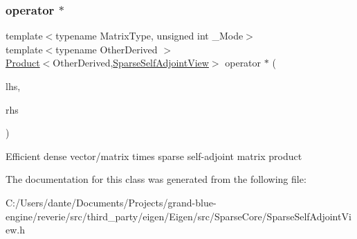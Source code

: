\subsubsection{\texorpdfstring{operator $\ast$}{operator *}\hspace{0.1cm}{\footnotesize\ttfamily [2/2]}}
{\footnotesize\ttfamily template$<$typename Matrix\+Type, unsigned int \+\_\+\+Mode$>$ \\
template$<$typename Other\+Derived $>$ \\
\mbox{\hyperlink{class_eigen_1_1_product}{Product}}$<$Other\+Derived,\mbox{\hyperlink{class_eigen_1_1_sparse_self_adjoint_view}{Sparse\+Self\+Adjoint\+View}}$>$ operator $\ast$ (\begin{DoxyParamCaption}\item[{const \mbox{\hyperlink{class_eigen_1_1_matrix_base}{Matrix\+Base}}$<$ Other\+Derived $>$ \&}]{lhs,  }\item[{const \mbox{\hyperlink{class_eigen_1_1_sparse_self_adjoint_view}{Sparse\+Self\+Adjoint\+View}}$<$ Matrix\+Type, \+\_\+\+Mode $>$ \&}]{rhs }\end{DoxyParamCaption})\hspace{0.3cm}{\ttfamily [friend]}}

Efficient dense vector/matrix times sparse self-\/adjoint matrix product 

The documentation for this class was generated from the following file\+:\begin{DoxyCompactItemize}
\item 
C\+:/\+Users/dante/\+Documents/\+Projects/grand-\/blue-\/engine/reverie/src/third\+\_\+party/eigen/\+Eigen/src/\+Sparse\+Core/Sparse\+Self\+Adjoint\+View.\+h\end{DoxyCompactItemize}
